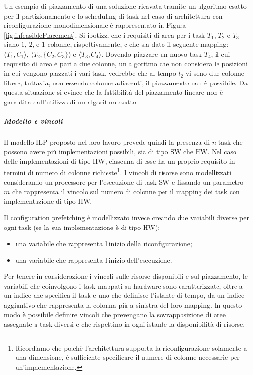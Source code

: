 Un esempio di piazzamento di una soluzione ricavata tramite un algoritmo esatto 
per il partizionamento e lo scheduling di task nel caso di 
architettura con riconfigurazione monodimensionale è rappresentato in 
Figura \ref{fig:infeasiblePlacement}. Si ipotizzi che i requisiti di area per i 
task $T_1$, $T_2$ e $T_3$ siano $1$, $2$, e $1$ colonne, rispettivamente, e che 
sia dato il seguente mapping: $\langle T_1, C_1 \rangle$, $\langle T_2, \{C_2, 
C_3\} \rangle$ e $\langle T_3, C_4 \rangle$. Dovendo piazzare un nuovo task 
$T_4$, il cui requisito di area è pari a due colonne, un algoritmo che non 
considera le posizioni in cui vengono piazzati i vari task, vedrebbe che al 
tempo $t_2$ vi sono due colonne libere; tuttavia, non essendo colonne 
adiacenti, il piazzamento non è possibile. Da questa situazione si evince che 
la fattibilità del piazzamento lineare non è garantita dall'utilizzo di un 
algoritmo esatto.

\subparagraph{Modello e vincoli}
Il modello ILP proposto nel loro lavoro prevede quindi la presenza di $n$ task 
che possono avere più implementazioni possibili, sia di tipo SW che HW. Nel 
caso delle implementazioni di tipo HW, ciascuna di esse ha un proprio requisito 
in termini di numero di colonne richieste\footnote{Ricordiamo che poichè 
l'architettura supporta la riconfigurazione solamente a una dimensione, è 
sufficiente specificare il numero di colonne necessarie per 
un'implementazione.}. I vincoli di risorse sono modellizzati considerando un 
processore per l'esecuzione di task SW e fissando un parametro $m$ che 
rappresenta il vincolo sul numero di colonne per il mapping dei task con 
implementazione di tipo HW.

Il configuration prefetching è modellizzato invece creando due variabili 
diverse per ogni task (se la sua implementazione è di tipo HW):
\begin{itemize}
 \item una variabile che rappresenta l'inizio della riconfigurazione;
 \item una variabile che rappresenta l'inizio dell'esecuzione.
\end{itemize}
Per tenere in considerazione i vincoli sulle risorse disponibili e sul 
piazzamento, le variabili che coinvolgono i task mappati su hardware sono 
caratterizzate, oltre a un indice che specifica il task e uno che definisce 
l'istante di tempo, da un indice aggiuntivo che rappresenta la colonna più a 
sinistra del loro mapping. In questo modo è possibile definire vincoli che 
prevengano la sovrapposizione di aree assegnate a task diversi e che rispettino 
in ogni istante la disponibilità di risorse.


